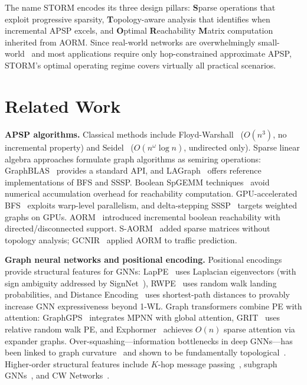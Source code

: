 \documentclass[journal]{IEEEtran}
\begin{document}
The name STORM encodes its three design pillars: \textbf{S}parse operations that exploit progressive sparsity, \textbf{T}opology-aware analysis that identifies when incremental APSP excels, and \textbf{O}ptimal \textbf{R}eachability \textbf{M}atrix computation inherited from AORM. Since real-world networks are overwhelmingly small-world~\cite{backstrom2012,barabasi1999} and most applications require only hop-constrained approximate APSP, STORM's optimal operating regime covers virtually all practical scenarios.


\section{Related Work}

\textbf{APSP algorithms.} Classical methods include Floyd-Warshall~\cite{floyd1962} ($O(n^3)$, no incremental property) and Seidel~\cite{seidel1995} ($O(n^\omega\!\log n)$, undirected only). Sparse linear algebra approaches formulate graph algorithms as semiring operations: GraphBLAS~\cite{davis2023graphblas} provides a standard API, and LAGraph~\cite{lagraph2022} offers reference implementations of BFS and SSSP. Boolean SpGEMM techniques~\cite{nagasaka2022bool} avoid numerical accumulation overhead for reachability computation. GPU-accelerated BFS~\cite{liu2022gpu} exploits warp-level parallelism, and delta-stepping SSSP~\cite{busato2022delta} targets weighted graphs on GPUs. AORM~\cite{aorm2021} introduced incremental boolean reachability with directed/disconnected support. S-AORM~\cite{saorm2022} added sparse matrices without topology analysis; GCNIR~\cite{gcnir2023} applied AORM to traffic prediction.

\textbf{Graph neural networks and positional encoding.} Positional encodings provide structural features for GNNs: LapPE~\cite{dwivedi2021lappe} uses Laplacian eigenvectors (with sign ambiguity addressed by SignNet~\cite{signnet}), RWPE~\cite{dwivedi2022rwpe} uses random walk landing probabilities, and Distance Encoding~\cite{distenc2020} uses shortest-path distances to provably increase GNN expressiveness beyond 1-WL. Graph transformers combine PE with attention: GraphGPS~\cite{graphgps} integrates MPNN with global attention, GRIT~\cite{grit2023} uses relative random walk PE, and Exphormer~\cite{exphormer2023} achieves $O(n)$ sparse attention via expander graphs. Over-squashing---information bottlenecks in deep GNNs---has been linked to graph curvature~\cite{oversquashing} and shown to be fundamentally topological~\cite{digiovanni2023}. Higher-order structural features include $K$-hop message passing~\cite{kpgnn2022}, subgraph GNNs~\cite{esan2022}, and CW Networks~\cite{bodnar2022cw}.
\end{document}
